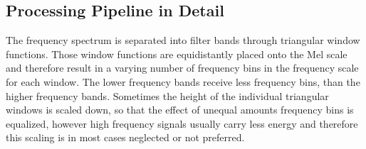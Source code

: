 
\subsection{Processing Pipeline in Detail}\label{sec:signal_mfcc_pipeline}
The frequency spectrum is separated into filter bands through triangular window functions.
Those window functions are equidistantly placed onto the Mel scale and therefore result in a varying number of frequency bins in the frequency scale for each window.
The lower frequency bands receive less frequency bins, than the higher frequency bands.
Sometimes the height of the individual triangular windows is scaled down, so that the effect of unequal amounts frequency bins is equalized, however high frequency signals usually carry less energy and therefore this scaling is in most cases neglected or not preferred.

